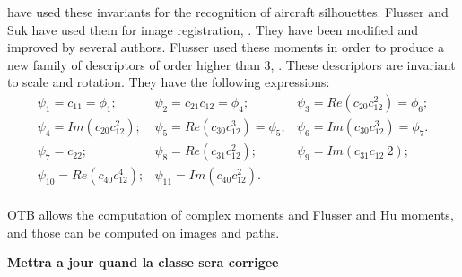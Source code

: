 \cite{dudani} have used these invariants for the recognition of
aircraft silhouettes. Flusser and Suk have used them for image
registration, \cite{flusser_2}. They have been modified and
improved by several authors. Flusser used these moments in order to
produce a new family of descriptors of order higher than 3,
\cite{flusserinv}. These descriptors are invariant to scale and
rotation. They have the following expressions:
\begin {equation}
\begin{array}{ccc}
\psi_1  = c_{11} = \phi_1; &  \psi_2  = c_{21}c_{12} = \phi_4; & \psi_3  = Re(c_{20}c_{12}^2) = \phi_6;\\
\psi_4  = Im(c_{20}c_{12}^2); & \psi_5  = Re(c_{30}c_{12}^3) = \phi_5;
& \psi_6  = Im(c_{30}c_{12}^3) = \phi_7.\\
\psi_7  = c_{22}; & \psi_8  = Re(c_{31}c_{12}^2); & \psi_9  = Im(c_{31}c_{12}~2);\\
\psi_{10} = Re(c_{40}c_{12}^4); & \psi_{11} = Im(c_{40}c_{12}^2). &\\

\end{array}
\end {equation}

OTB allows the computation of complex moments and Flusser and Hu
moments, and those can be computed on images and paths.

\textbf{Mettra a jour quand la classe sera corrigee}




